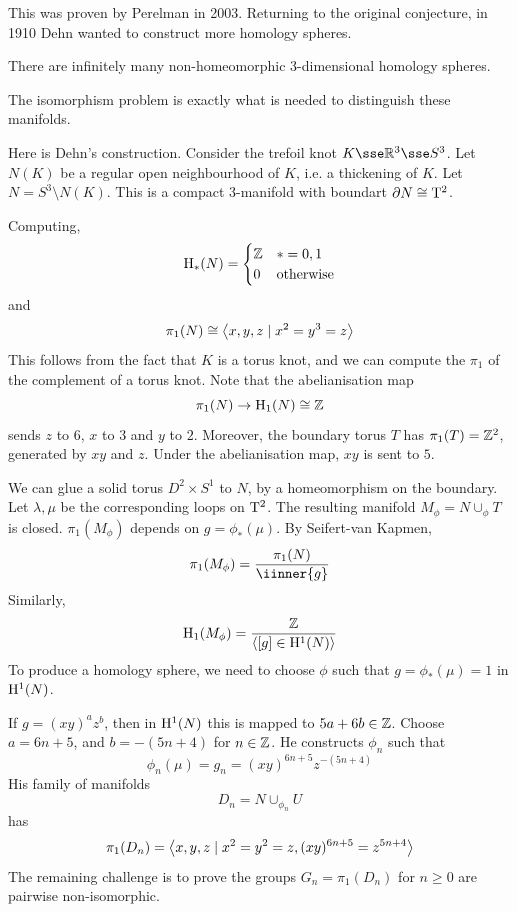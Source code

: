 \documentclass{article}
\begin{document}
This was proven by Perelman in 2003. Returning to the original conjecture, in 1910 Dehn wanted to construct more homology spheres.

\begin{theorem}
    [Dehn, 1910] There are infinitely many non-homeomorphic 3-dimensional homology spheres.
\end{theorem}

\begin{remark}
    The isomorphism problem is exactly what is needed to distinguish these manifolds.
\end{remark}

\lec

Here is Dehn's construction. Consider the trefoil knot \(K \sse \R^3 \sse S^3\). Let \(N(K)\) be a regular open neighbourhood of \(K\), i.e. a thickening of \(K\). Let \(N = S^3 \setminus N(K)\). This is a compact 3-manifold with boundart \(\partial N \cong \mathrm{T}^2\).

Computing,
\[\mathrm{H}_*(N) = \begin{cases}
    \mathbb{Z} & * = 0, 1 \\
    0 & \text{otherwise}
\end{cases}\]
and
\[\pi_1(N) \cong \left\langle x, y, z \mid x^2 = y^3 = z \right\rangle\]
This follows from the fact that \(K\) is a torus knot, and we can compute the \(\pi_1\) of the complement of a torus knot. Note that the abelianisation map
\[\pi_1(N) \to \mathrm{H}_1(N) \cong \mathbb{Z}\]
sends \(z\) to \(6\), \(x\) to \(3\) and \(y\) to \(2\). Moreover, the boundary torus \(T\) has \(\pi_1(T) = \mathbb{Z}^2\), generated by \(xy\) and \(z\). Under the abelianisation map, \(xy\) is sent to \(5\).

We can glue a solid torus \(D^2 \times S^1\) to \(N\), by a homeomorphism on the boundary. Let \(\lambda, \mu\) be the corresponding loops on \(\mathrm{T}^2\). The resulting manifold \(M_\phi = N \cup_\phi T\) is closed. \(\pi_1(M_\phi)\) depends on \(g = \phi_*(\mu)\). By Seifert-van Kapmen, 
\[\pi_1(M_\phi) = \frac{\pi_1(N)}{\iinner{g}}\]
Similarly,
\[\mathrm{H}_1(M_\phi) = \frac{\mathbb{Z}}{\left\langle [g] \in \mathrm{H}^1(N) \right\rangle}\]
To produce a homology sphere, we need to choose \(\phi\) such that \(g = \phi_*(\mu) = 1\) in \(\mathrm{H}^1(N)\).

If \(g = (xy)^az^b\), then in \(\mathrm{H}^1(N)\) this is mapped to \(5a + 6b \in \mathbb{Z}\). Choose \(a = 6n + 5\), and \(b = -(5n + 4)\) for \(n \in \mathbb{Z}\). He constructs \(\phi_n\) such that
\[\phi_n(\mu) = g_n = (xy)^{6n+5}z^{-(5n+4)}\]
His family of manifolds
\[D_n = N \cup_{\phi_n} U\]
has
\[\pi_1(D_n) = \left\langle x, y, z \mid x^2 = y^2 = z, (xy)^{6n+5} = z^{5n + 4} \right\rangle\]
The remaining challenge is to prove the groups \(G_n = \pi_1(D_n)\) for \(n \ge 0\) are pairwise non-isomorphic.
\end{document}
